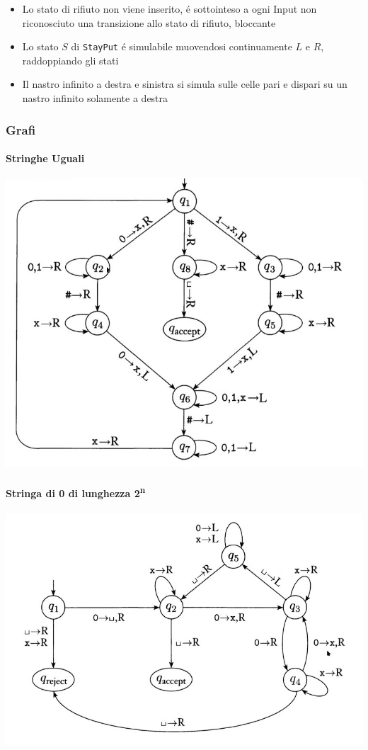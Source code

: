 \documentclass[
                        12pt, %
                        a4paper, %
                        oneside, %
                        headinclude,footinclude, %
                        BCOR5mm, %
                  ]{scrartcl}
\begin{document}
\begin{itemize}
\item Lo stato di rifiuto non viene inserito, é sottointeso a ogni Input non riconosciuto una transizione allo stato di rifiuto, bloccante
\item Lo stato \(S\) di \texttt{StayPut} é simulabile muovendosi continuamente \(L\) e \(R\), raddoppiando gli stati
\item Il nastro infinito a destra e sinistra si simula sulle celle pari e dispari su un nastro infinito solamente a destra
\end{itemize}

\subsubsection{Grafi}
\label{sec:orgbc9ec7c}
\paragraph{Stringhe Uguali}
\label{sec:org790c59e}
\begin{center}
\includegraphics[width=.9\linewidth]{../media/img/grafoEs1.jpg}
\end{center}
\paragraph{Stringa di 0 di lunghezza 2\textsuperscript{n}}
\label{sec:org1389025}
\begin{center}
\includegraphics[width=.9\linewidth]{../media/img/graphPowerOfTwoLength.jpg}
\end{center}
\end{document}

